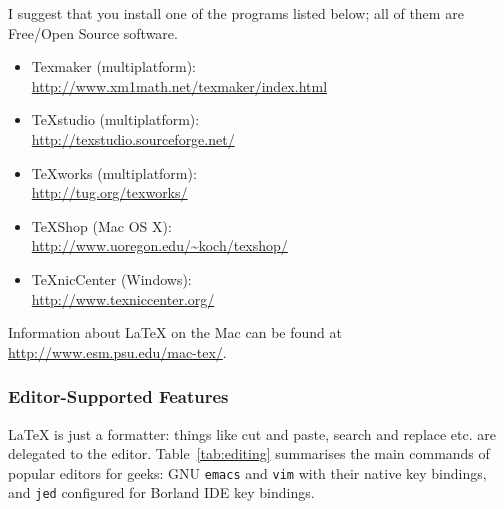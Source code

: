\documentclass[a4paper,11pt]{article}
\newcommand{\app}[1]
{\texttt{#1}}
\begin{document}
I suggest that you install one of the programs listed below; all of
them are Free/Open Source software.

\begin{itemize}

  \item Texmaker (multiplatform):\\
  \url{http://www.xm1math.net/texmaker/index.html}

  \item TeXstudio (multiplatform):\\
  \url{http://texstudio.sourceforge.net/}

  \item TeXworks (multiplatform):\\
  \url{http://tug.org/texworks/}
  
  
  \item TeXShop (Mac OS X):\\
  \url{http://www.uoregon.edu/~koch/texshop/}
  
  \item TeXnicCenter (Windows):\\
  \url{http://www.texniccenter.org/}
    
\end{itemize}

Information about \LaTeX{} on the Mac can be found at
\url{http://www.esm.psu.edu/mac-tex/}.



\subsubsection{Editor-Supported Features}

\LaTeX{} is just a formatter: things like cut and paste, search and
replace etc. are delegated to the editor. Table~\ref{tab:editing}
summarises the main commands of popular editors for geeks: GNU
\app{emacs} and \app{vim} with their native key bindings, and
\app{jed} configured for Borland IDE key bindings.
\end{document}
